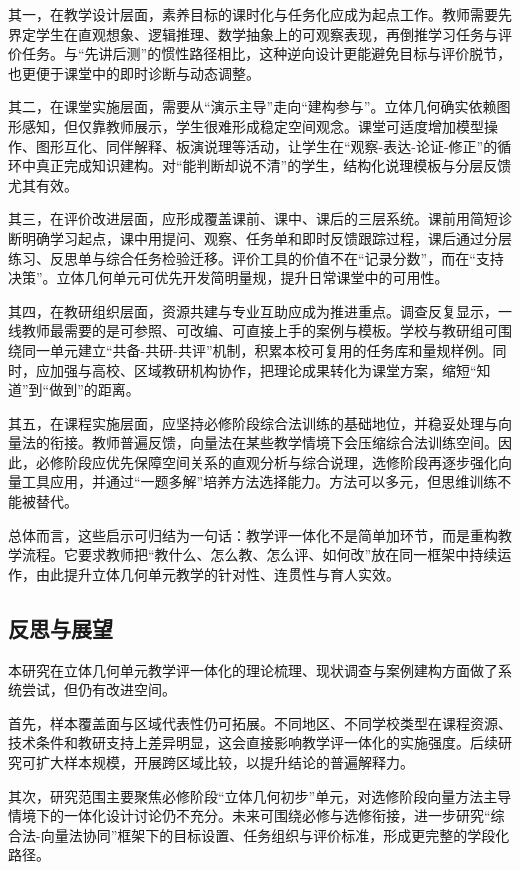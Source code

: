 \documentclass[UTF8,a4paper,12pt,twoside]{ctexart}
\begin{document}
其一，在教学设计层面，素养目标的课时化与任务化应成为起点工作。教师需要先界定学生在直观想象、逻辑推理、数学抽象上的可观察表现，再倒推学习任务与评价任务。与“先讲后测”的惯性路径相比，这种逆向设计更能避免目标与评价脱节，也更便于课堂中的即时诊断与动态调整。

其二，在课堂实施层面，需要从“演示主导”走向“建构参与”。立体几何确实依赖图形感知，但仅靠教师展示，学生很难形成稳定空间观念。课堂可适度增加模型操作、图形互化、同伴解释、板演说理等活动，让学生在“观察-表达-论证-修正”的循环中真正完成知识建构。对“能判断却说不清”的学生，结构化说理模板与分层反馈尤其有效。

其三，在评价改进层面，应形成覆盖课前、课中、课后的三层系统。课前用简短诊断明确学习起点，课中用提问、观察、任务单和即时反馈跟踪过程，课后通过分层练习、反思单与综合任务检验迁移。评价工具的价值不在“记录分数”，而在“支持决策”。立体几何单元可优先开发简明量规，提升日常课堂中的可用性。

其四，在教研组织层面，资源共建与专业互助应成为推进重点。调查反复显示，一线教师最需要的是可参照、可改编、可直接上手的案例与模板。学校与教研组可围绕同一单元建立“共备-共研-共评”机制，积累本校可复用的任务库和量规样例。同时，应加强与高校、区域教研机构协作，把理论成果转化为课堂方案，缩短“知道”到“做到”的距离。

其五，在课程实施层面，应坚持必修阶段综合法训练的基础地位，并稳妥处理与向量法的衔接。教师普遍反馈，向量法在某些教学情境下会压缩综合法训练空间。因此，必修阶段应优先保障空间关系的直观分析与综合说理，选修阶段再逐步强化向量工具应用，并通过“一题多解”培养方法选择能力。方法可以多元，但思维训练不能被替代。

总体而言，这些启示可归结为一句话：教学评一体化不是简单加环节，而是重构教学流程。它要求教师把“教什么、怎么教、怎么评、如何改”放在同一框架中持续运作，由此提升立体几何单元教学的针对性、连贯性与育人实效。

\subsection{反思与展望}

本研究在立体几何单元教学评一体化的理论梳理、现状调查与案例建构方面做了系统尝试，但仍有改进空间。

首先，样本覆盖面与区域代表性仍可拓展。不同地区、不同学校类型在课程资源、技术条件和教研支持上差异明显，这会直接影响教学评一体化的实施强度。后续研究可扩大样本规模，开展跨区域比较，以提升结论的普遍解释力。

其次，研究范围主要聚焦必修阶段“立体几何初步”单元，对选修阶段向量方法主导情境下的一体化设计讨论仍不充分。未来可围绕必修与选修衔接，进一步研究“综合法-向量法协同”框架下的目标设置、任务组织与评价标准，形成更完整的学段化路径。
\end{document}

